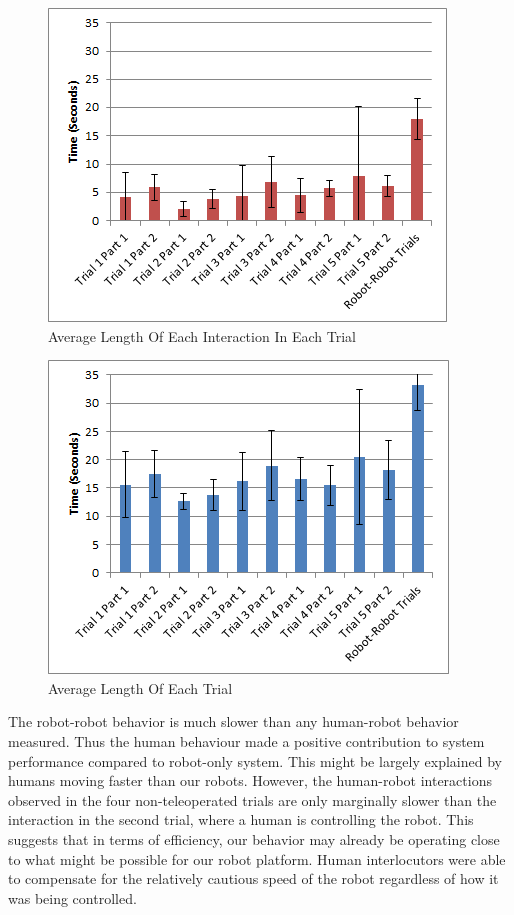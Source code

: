 \documentclass[letterpaper, 10 pt, conference]{ieeeconf}  %
\begin{document}
       \begin{figure}
      \centering
      \includegraphics{interaction_length.png}
      \caption{Average Length Of Each Interaction In Each Trial}
      \label{fig:Interaction}
   \end{figure}


     \begin{figure}
      \centering
      \includegraphics{trial_length.png}
      \caption{Average Length Of Each Trial}
      \label{fig:Trial}
   \end{figure}

The robot-robot behavior is much slower than any human-robot behavior measured. Thus the human behaviour made a positive contribution to system performance compared to robot-only system. This might be largely explained by  humans moving faster than our robots. However, the human-robot interactions observed in the four non-teleoperated trials are only marginally slower than the interaction in the second trial, where a human is controlling the robot. This suggests that in terms of efficiency, our behavior may already be operating close to what might be possible for our robot platform. Human interlocutors were able to compensate for the relatively cautious speed of the robot regardless of how it was being controlled. 
\end{document}
